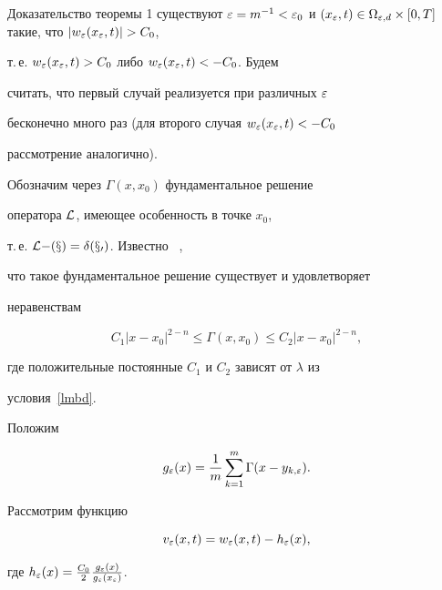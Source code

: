 \begin{pf*}{Доказательство теоремы 1}
существуют $\eps=m^{-1}<\eps_0$ и $(x_\eps,t)\in


\Omega_{\eps,d}\times [0,T]$ такие, что $|w_\eps(x_\eps,t)|>C_0$,


т.\,е. $w_\varepsilon(x_\varepsilon,t)>C_0$ либо $w_\varepsilon(x_\varepsilon,t)<-C_0$. Будем


считать, что первый случай реализуется при различных $\varepsilon$


бесконечно много раз (для второго случая $w_\varepsilon(x_\varepsilon,t)<-C_0$


рассмотрение аналогично).





Обозначим через $\Gamma(x,x_0)$ фундаментальное решение


оператора ${\cal{L}}$, имеющее особенность в точке $x_0$,


т.\,е. $\cal{L}\Gamma(x)=\delta(x_0)$. Известно ~\cite{LSW},


что такое фундаментальное решение существует и удовлетворяет


неравенствам


\begin{equation}


C_1|x-x_0|^{2-n} \le\Gamma(x,x_0)\le C_2|x-x_0|^{2-n}, \label{fs}


\end{equation}


где положительные постоянные $C_1$ и $C_2$ зависят от $\lambda$ из


условия~\eqref{lmbd}.





Положим


\begin{equation}


g_\eps(x)=\frac{1}{m}\sum_{k=1}^m\Gamma(x-y_{k,\eps}).


\label{gdef}


\end{equation}





Рассмотрим функцию


\begin{equation}


v_\eps(x,t)=w_\eps(x,t)-h_{\eps}(x), \label{vdef}


\end{equation}


где $h_{\varepsilon}(x)=\frac{C_0}{2}\frac{g_\varepsilon(x)}{g_\varepsilon(x_\varepsilon)}$.



\end{pf*}
